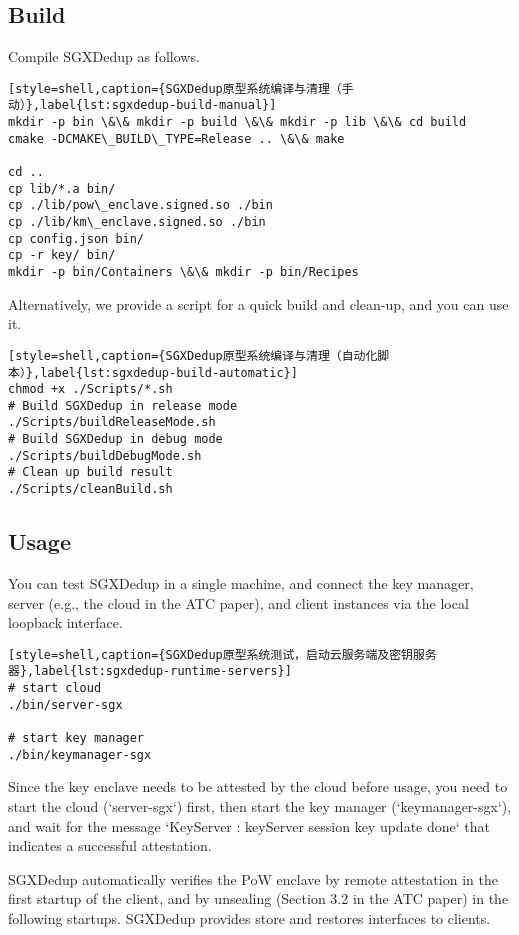 \subsection{Build}

Compile SGXDedup as follows.

\begin{lstlisting}[style=shell,caption={SGXDedup原型系统编译与清理（手动）},label{lst:sgxdedup-build-manual}]
mkdir -p bin \&\& mkdir -p build \&\& mkdir -p lib \&\& cd build
cmake -DCMAKE\_BUILD\_TYPE=Release .. \&\& make

cd ..
cp lib/*.a bin/
cp ./lib/pow\_enclave.signed.so ./bin
cp ./lib/km\_enclave.signed.so ./bin
cp config.json bin/
cp -r key/ bin/
mkdir -p bin/Containers \&\& mkdir -p bin/Recipes
\end{lstlisting}

Alternatively, we provide a script for a quick build and clean-up, and you can use it.

\begin{lstlisting}[style=shell,caption={SGXDedup原型系统编译与清理（自动化脚本）},label{lst:sgxdedup-build-automatic}]
chmod +x ./Scripts/*.sh
# Build SGXDedup in release mode
./Scripts/buildReleaseMode.sh
# Build SGXDedup in debug mode
./Scripts/buildDebugMode.sh
# Clean up build result
./Scripts/cleanBuild.sh
\end{lstlisting}

\subsection{Usage}

You can test SGXDedup in a single machine, and connect the key manager, server (e.g., the cloud in the ATC paper), and client instances via the local loopback interface.

\begin{lstlisting}[style=shell,caption={SGXDedup原型系统测试，启动云服务端及密钥服务器},label{lst:sgxdedup-runtime-servers}]
# start cloud
./bin/server-sgx

# start key manager
./bin/keymanager-sgx
\end{lstlisting}

Since the key enclave  needs to be attested by the cloud before usage, you need to start the cloud (`server-sgx`) first, then start the key manager (`keymanager-sgx`), and wait for the message `KeyServer : keyServer session key update done` that indicates a successful attestation.

SGXDedup automatically verifies the PoW enclave by remote attestation in the first startup of the client, and by unsealing (Section 3.2 in the ATC paper) in the following startups. SGXDedup provides store and restores interfaces to clients.

